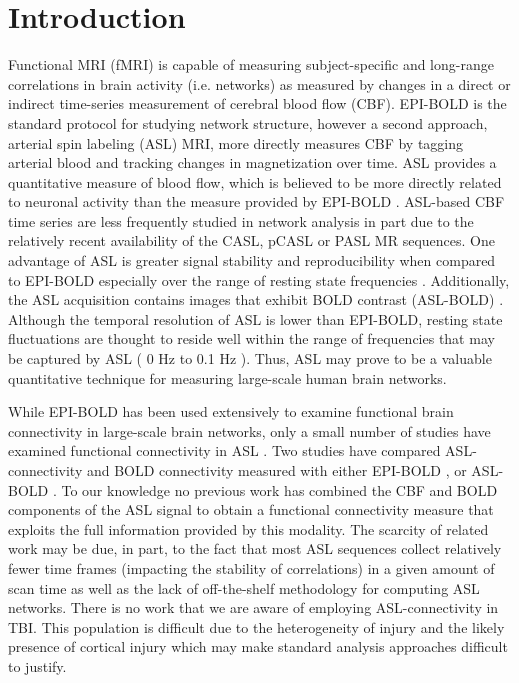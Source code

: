 \documentclass{llncs}
\begin{document}
\section{Introduction}
Functional MRI (fMRI) is capable of measuring subject-specific and long-range correlations in brain activity (i.e. networks) as measured by changes in a direct or indirect time-series measurement of cerebral blood flow (CBF).  EPI-BOLD is the standard protocol for studying network structure, however a second approach, arterial spin labeling (ASL) MRI, more directly measures CBF by tagging arterial blood and tracking changes in magnetization over time. ASL provides a quantitative measure of blood flow, which is believed to be more directly related to neuronal activity than the measure provided by EPI-BOLD \cite{Wong1997}.  ASL-based CBF time series are less frequently studied in network analysis in part due to the relatively recent availability of the CASL, pCASL or PASL MR sequences.  One advantage of ASL is greater signal stability and reproducibility when compared to EPI-BOLD especially over the range of resting state frequencies \cite{Aguirre2002}.  Additionally, the ASL acquisition contains images that exhibit BOLD contrast (ASL-BOLD) \cite{Wong1997}. Although the temporal resolution of ASL is lower than EPI-BOLD, resting state fluctuations are thought to reside well within the range of frequencies that may be captured by ASL ( 0 Hz to 0.1 Hz ).  Thus, ASL may prove to be a valuable quantitative technique for measuring large-scale human brain networks.


While EPI-BOLD has been used extensively to examine functional brain connectivity in large-scale brain networks, only a small number of studies have examined functional connectivity in ASL \cite{Chuang2008,Zou2009}. Two studies have compared ASL-connectivity and BOLD connectivity measured with either EPI-BOLD \cite{Li2012}, or ASL-BOLD \cite{Viviani2011}.  To our knowledge no previous work has combined the CBF and BOLD components of the ASL signal to obtain a functional connectivity measure that exploits the full information provided by this modality. The scarcity of related work may be due, in part, to the fact that most ASL sequences collect relatively fewer time frames (impacting the stability of correlations) in a given amount of scan time as well as the lack of off-the-shelf methodology for computing ASL networks.  There is no work that we are aware of employing ASL-connectivity in TBI.   This population is difficult due to the heterogeneity of injury and the likely presence of cortical injury which may make standard analysis approaches difficult to justify. 
\end{document}
